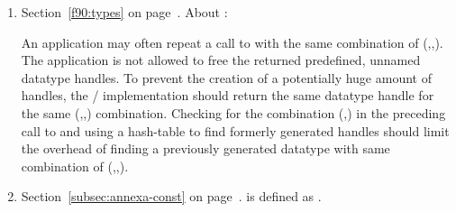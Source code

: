 \begin{enumerate}
\item
Section~\ref{f90:types} on page~\pageref{f90:types}.
\newline
About :
\begin{implementors}
An application may often repeat a call to
 with the same combination of 
(\mpiarg{\XXX/},,).
The application is not allowed to free the returned predefined, unnamed
datatype handles. To prevent the creation of a potentially huge amount of
handles, the \MPI/ implementation should return the same datatype handle for
the same (,,) combination. 
Checking for the
combination (,) in the preceding call to 
 and
using a hash-table to find formerly generated handles should limit the
overhead of finding a previously generated datatype with same combination
of (\mpiarg{\XXX/},,).
\end{implementors}

\item
Section~\ref{subsec:annexa-const} on page~\pageref{subsec:annexa-const}.
\newline
{} is defined as
. 
 
\end{enumerate}
